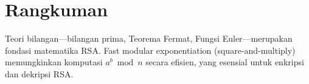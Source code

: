 \section*{Rangkuman}
Teori bilangan---bilangan prima, Teorema Fermat, Fungsi Euler---merupakan fondasi matematika RSA. Fast modular exponentiation (square-and-multiply) memungkinkan komputasi $a^b \bmod n$ secara efisien, yang esensial untuk enkripsi dan dekripsi RSA.

